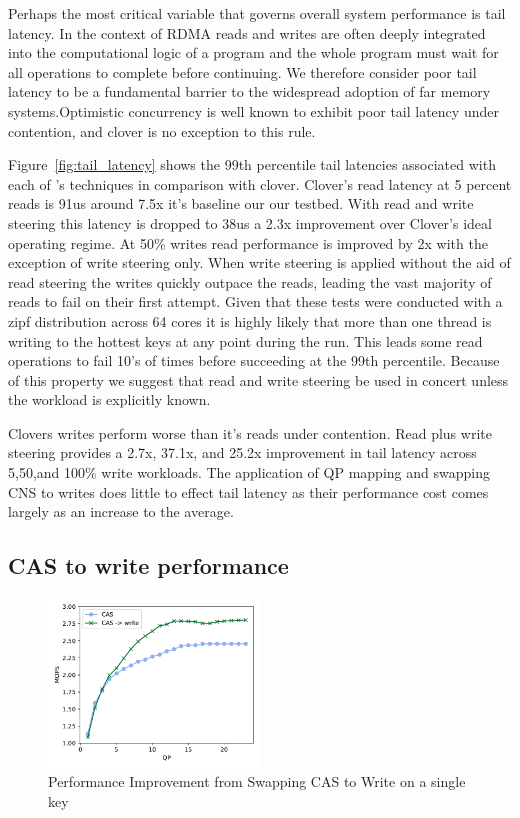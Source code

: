 Perhaps the most critical variable that governs overall system performance is
tail latency. In the context of RDMA reads and writes are often deeply
integrated into the computational logic of a program and the whole program must
wait for all operations to complete before continuing. We therefore consider
poor tail latency to be a fundamental barrier to the widespread adoption of far
memory systems.Optimistic concurrency is well known to exhibit poor tail latency
under contention, and clover is no exception to this rule. 

Figure~\ref{fig:tail_latency} shows the 99th percentile tail latencies
associated with each of \sword's techniques in comparison with clover. Clover's
read latency at 5 percent reads is 91us around 7.5x it's baseline our our
testbed. With read and write steering this latency is dropped to 38us a 2.3x
improvement over Clover's ideal operating regime. At 50\% writes read
performance is improved by 2x with the exception of write steering only. When
write steering is applied without the aid of read steering the writes quickly
outpace the reads, leading the vast majority of reads to fail on their first
attempt. Given that these tests were conducted with a zipf distribution across
64 cores it is highly likely that more than one thread is writing to the hottest
keys at any point during the run. This leads some read operations to fail 10's
of times before succeeding at the 99th percentile. Because of this property we
suggest that read and write steering be used in concert unless the workload is
explicitly known.

Clovers writes perform worse than it's reads under contention. Read plus write
steering provides a 2.7x, 37.1x, and 25.2x improvement in tail latency across
5,50,and 100\% write workloads. The application of QP mapping and swapping CNS
to writes does little to effect tail latency as their performance cost comes
largely as an increase to the average.


\subsection{CAS to write performance}

\begin{figure}
    \includegraphics[width=0.5\textwidth]{fig/cas_vs_swap.pdf}
    \caption{Performance Improvement from Swapping CAS to Write on a single key}
    \label{fig:cas_vs_swap}
\end{figure}

